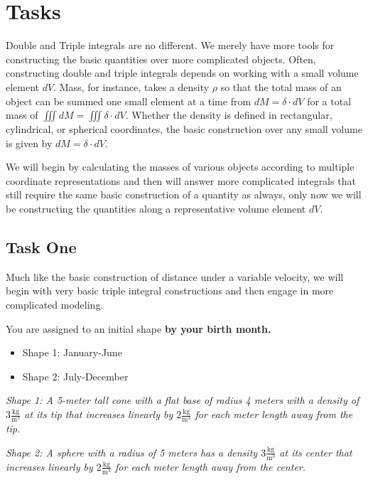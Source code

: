\documentclass{ximera}
\begin{document}
\section{Tasks}

Double and Triple integrals are no different. We merely have more tools for constructing the basic quantities over more complicated objects. Often, constructing double and triple integrals depends on working with a small volume element $dV$. Mass, for instance, takes a density $\rho$ so that the total mass of an object can be summed one small element at a time from $dM=\delta\cdot dV$ for a total mass of $\iiint dM=\iiint\delta\cdot dV$. Whether the density is defined in rectangular, cylindrical, or spherical coordinates, the basic construction over any small volume is given by $dM=\delta\cdot dV$.

We will begin by calculating the masses of various objects according to multiple coordinate representations and then will answer more complicated integrals that still require the same basic construction of a quantity as always, only now we will be constructing the quantities along a representative volume element $dV$.

\subsection{Task One}

Much like the basic construction of distance under a variable velocity, we will begin with very basic triple integral constructions and then engage in more complicated modeling.

You are assigned to an initial shape \textbf{by your birth month.}

\begin{itemize}
\item Shape 1: January-June
\item Shape 2: July-December
\end{itemize}

\textit{Shape 1: A 5-meter tall cone with a flat base of radius 4 meters with a density of $3 \frac{\text{kg}}{\text{m}^3}$ at its tip that increases linearly by $2 \frac{\text{kg}}{\text{m}^3}$ for each meter length away from the tip.}

\textit{Shape 2: A sphere with a radius of 5 meters has a density $3 \frac{\text{kg}}{\text{m}^3}$ at its center that increases linearly by $2 \frac{\text{kg}}{\text{m}^3}$ for each meter length away from the center.}
\end{document}
